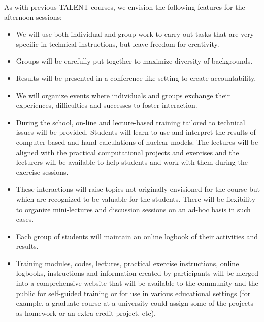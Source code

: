 \documentclass[%
oneside,                 %
final,                   %
10pt]{article}
\begin{document}
As with previous TALENT courses, we envision
the following features for the afternoon sessions: 
\begin{itemize}
\item We will use both individual and group work to carry out tasks that are very specific in technical instructions, but leave freedom for creativity.  

\item Groups will be carefully put together to maximize diversity of backgrounds.  

\item Results will be presented in a conference-like setting to create accountability.  

\item We will organize events where individuals and groups exchange their experiences, difficulties and successes to foster interaction.  

\item During the school, on-line and lecture-based training tailored to technical issues will be provided. Students will learn to use and interpret the results of computer-based and hand calculations of nuclear models. The lectures will be aligned with the practical computational projects and exercises and the lecturers will be available to help students and work with them during the exercise sessions.  

\item These interactions will raise topics not originally envisioned for the course but which are recognized to be valuable for the students. There will be flexibility to organize mini-lectures and discussion sessions on an ad-hoc basis in such cases.  

\item Each group of students will maintain an online logbook of their activities and results.  

\item Training modules, codes, lectures, practical exercise instructions, online logbooks, instructions and information created by participants will be merged into a comprehensive website that will be available to the community and the public for self-guided training or for use in various educational settings (for example, a graduate course at a university could assign some of the projects as homework or an extra credit project, etc).
\end{itemize}

\noindent
\end{document}
